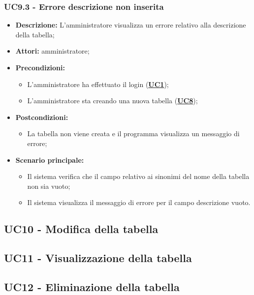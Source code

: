 \subsubsection{UC9.3 - Errore descrizione non inserita}
\label{sec:UC9.3}
\begin{itemize}
	\item \textbf{Descrizione:} L’amministratore visualizza un errore relativo alla descrizione della tabella;
	\item \textbf{Attori:} amministratore;
	\item \textbf{Precondizioni:} 
	\begin{itemize}
		\item L’amministratore ha effettuato il login (\hyperref[sec:UC1]{\textbf{UC1}});
		\item L’amministratore sta creando una nuova tabella (\hyperref[sec:UC1]{\textbf{UC8}});
	\end{itemize}
	\item \textbf{Postcondizioni:} 
	\begin{itemize}
		\item La tabella non viene creata e il programma visualizza un messaggio di errore;
	\end{itemize}
	\item \textbf{Scenario principale:} 
	\begin{itemize}
		\item Il sistema verifica che il campo relativo ai sinonimi del nome della tabella non sia vuoto;
		\item Il sistema visualizza il messaggio di errore per il campo descrizione vuoto.
	\end{itemize}
\end{itemize}

\subsection{UC10 - Modifica della tabella}
\label{sec:UC10}

\subsection{UC11 - Visualizzazione della tabella}
\label{sec:UC11}

\subsection{UC12 - Eliminazione della tabella}
\label{sec:UC12}

